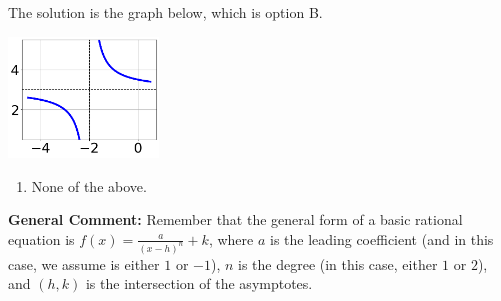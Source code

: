 \documentclass{extbook}[14pt]
\begin{document}
\begin{enumerate}
{The solution is the graph below, which is option B.
\begin{center}
    \includegraphics[width=0.3\textwidth]{../Figures/rationalEquationToGraphBC.png}
\end{center}\begin{enumerate}[label=\Alph*.]
\item None of the above.\end{enumerate}
\textbf{General Comment:} Remember that the general form of a basic rational equation is $ f(x) = \frac{a}{(x-h)^n} + k$, where $a$ is the leading coefficient (and in this case, we assume is either $1$ or $-1$), $n$ is the degree (in this case, either $1$ or $2$), and $(h, k)$ is the intersection of the asymptotes.
}
\end{enumerate}
\end{document}
